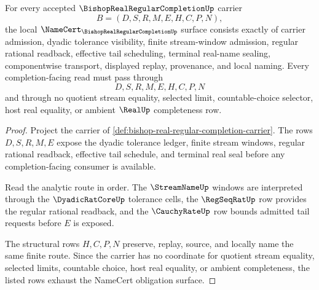 \begin{theorem}
\label{thm:bishop-real-regular-completion-namecert-obligations}
For every accepted $\BishopRealRegularCompletionUp$ carrier
$$
B=(D,S,R,M,E,H,C,P,N),
$$
the local $\NameCert_{\BishopRealRegularCompletionUp}$ surface consists exactly of carrier admission, dyadic tolerance visibility, finite stream-window admission, regular rational readback, effective tail scheduling, terminal real-name sealing, componentwise transport, displayed replay, provenance, and local naming. Every completion-facing read must pass through
$$
D,S,R,M,E,H,C,P,N
$$
and through no quotient stream equality, selected limit, countable-choice selector, host real equality, or ambient $\RealUp$ completeness row.
\end{theorem}
\begin{proof}
Project the carrier of \autoref{def:bishop-real-regular-completion-carrier}. The rows $D,S,R,M,E$ expose the dyadic tolerance ledger, finite stream windows, regular rational readback, effective tail schedule, and terminal real seal before any completion-facing consumer is available.

Read the analytic route in order. The $\StreamNameUp$ windows are interpreted through the $\DyadicRatCoreUp$ tolerance cells, the $\RegSeqRatUp$ row provides the regular rational readback, and the $\CauchyRateUp$ row bounds admitted tail requests before $E$ is exposed.

The structural rows $H,C,P,N$ preserve, replay, source, and locally name the same finite route. Since the carrier has no coordinate for quotient stream equality, selected limits, countable choice, host real equality, or ambient completeness, the listed rows exhaust the NameCert obligation surface.
\end{proof}

